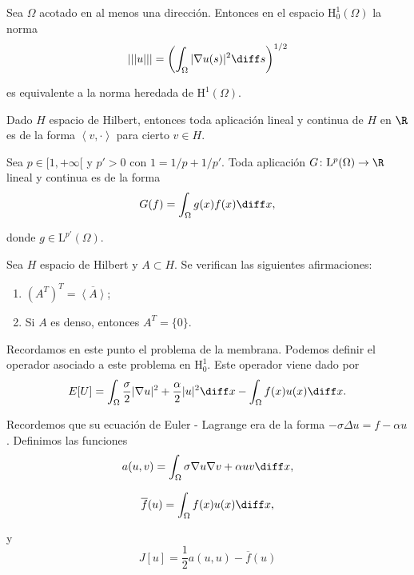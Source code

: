 \documentclass{article}
\begin{document}
\begin{theorem}
  \label{thm:h1-norma}
  Sea $\Omega$ acotado en al menos una dirección. Entonces en el espacio $\mathrm{H}_0^1(\Omega)$ la
  norma
  \[ ||| u ||| = \left( \int_{\Omega} |\nabla u (s)|^2 \diff s \right)^{1/2}\]

  es equivalente a la norma heredada de $\mathrm{H}^1(\Omega)$.
\end{theorem}

\begin{theorem}
  \label{thm:rep-riesz}
  Dado $H$ espacio de Hilbert, entonces toda aplicación lineal y continua de $H$ en $\R$ es de la
  forma $\left\langle v, \cdot \right\rangle$ para cierto $v \in H$.
\end{theorem}

\begin{theorem}
  \label{thm:riesz-lp}
  Sea $p \in [1, +\infty[$ y $p' > 0$ con $1 = 1/p + 1/p'$. Toda aplicación
  $G \colon \mathrm{L}^p(\Omega) \to \R$ lineal y continua es de la forma
  \[ G(f) = \int_{\Omega} g(x)f(x) \diff x, \]

  donde $g \in \mathrm{L}^{p'}(\Omega)$.
\end{theorem}

\begin{lemma}
  Sea $H$ espacio de Hilbert y $A \subset H$. Se verifican las siguientes afirmaciones:
  \begin{enumerate}
  \item $(A^T)^T = \overline{\left\langle A \right\rangle}$;
  \item Si $A$ es denso, entonces $A^T = \{0\}$.
  \end{enumerate}
\end{lemma}

Recordamos en este punto el problema de la membrana. Podemos definir el operador asociado a este
problema en $\mathrm{H}_0^1$. Este operador viene dado por
\[ E[U] = \int_{\Omega} \frac{\sigma}{2} |\nabla u|^2 + \frac{\alpha}{2} |u|^2 \diff x -
  \int_{\Omega} f(x)u(x) \diff x.\]

Recordemos que su ecuación de Euler - Lagrange era de la forma $-\sigma \Delta u = f - \alpha u$.
Definimos las funciones
\[ a(u,v) = \int_{\Omega} \sigma \nabla u \nabla v + \alpha uv \diff x, \]

\[ \overline{f}(u) = \int_{\Omega} f(x)u(x) \diff x, \]

y
\[ J[u] = \frac{1}{2} a(u,u) - \overline{f}(u) \]
\end{document}

